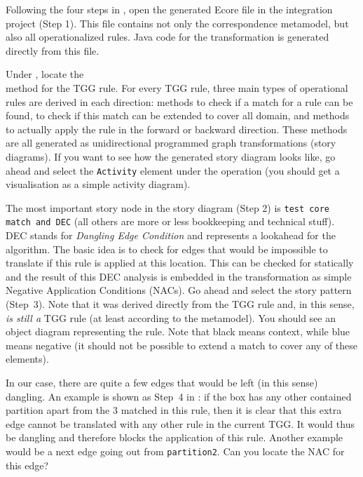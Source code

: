 \begin{stepbystep}
\item Following the four steps in , open the generated Ecore file in the integration project (Step 1).
This file contains not only the correspondence metamodel, but also all operationalized rules.
Java code for the transformation is generated directly from this file.
\item Under , locate the \\ method for the TGG rule.
For every TGG rule, three main types of operational rules are derived in each direction:   methods to check if a match for a rule can be found,  to check if this match can be extended to cover all domain, and  methods to actually apply the rule in the forward or backward direction.
These methods are all generated as unidirectional programmed graph transformations (story diagrams).
If you want to see how the generated story diagram looks like, go ahead and select the \texttt{Activity} element under the operation (you should get a visualisation as a simple activity diagram).
\item The most important story node in the story diagram (Step 2) is \texttt{test core match and DEC} (all others are more or less bookkeeping and technical stuff).
DEC stands for \emph{Dangling Edge Condition} and represents a lookahead for the algorithm.
The basic idea is to check for edges that would be impossible to translate if this rule is applied at this location.
This can be checked for statically and the result of this DEC analysis is embedded in the transformation as simple Negative Application Conditions (NACs). 
Go ahead and select the story pattern (Step~3).
Note that it was derived directly from the TGG rule and, in this sense, \emph{is still a} TGG rule (at least according to the metamodel).
You should see an object diagram representing the rule.
Note that black means context, while blue means negative (it should not be possible to extend a match to cover any of these elements).

\item In our case, there are quite a few edges that would be left (in this sense) dangling.
An example is shown as Step~4 in :  if the box has any other contained partition apart from the 3 matched in this rule, then it is clear that this extra edge cannot be translated with any other rule in the current TGG.
It would thus be dangling and therefore blocks the application of this rule.
Another example would be a next edge going out from \texttt{partition2}.
Can you locate the NAC for this edge?
\end{stepbystep}

